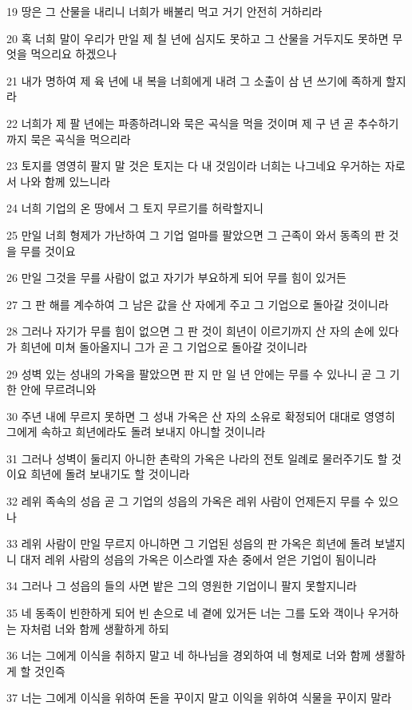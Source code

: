 \par 19 땅은 그 산물을 내리니 너희가 배불리 먹고 거기 안전히 거하리라
\par 20 혹 너희 말이 우리가 만일 제 칠 년에 심지도 못하고 그 산물을 거두지도 못하면 무엇을 먹으리요 하겠으나
\par 21 내가 명하여 제 육 년에 내 복을 너희에게 내려 그 소출이 삼 년 쓰기에 족하게 할지라
\par 22 너희가 제 팔 년에는 파종하려니와 묵은 곡식을 먹을 것이며 제 구 년 곧 추수하기까지 묵은 곡식을 먹으리라
\par 23 토지를 영영히 팔지 말 것은 토지는 다 내 것임이라 너희는 나그네요 우거하는 자로서 나와 함께 있느니라
\par 24 너희 기업의 온 땅에서 그 토지 무르기를 허락할지니
\par 25 만일 너희 형제가 가난하여 그 기업 얼마를 팔았으면 그 근족이 와서 동족의 판 것을 무를 것이요
\par 26 만일 그것을 무를 사람이 없고 자기가 부요하게 되어 무를 힘이 있거든
\par 27 그 판 해를 계수하여 그 남은 값을 산 자에게 주고 그 기업으로 돌아갈 것이니라
\par 28 그러나 자기가 무를 힘이 없으면 그 판 것이 희년이 이르기까지 산 자의 손에 있다가 희년에 미쳐 돌아올지니 그가 곧 그 기업으로 돌아갈 것이니라
\par 29 성벽 있는 성내의 가옥을 팔았으면 판 지 만 일 년 안에는 무를 수 있나니 곧 그 기한 안에 무르려니와
\par 30 주년 내에 무르지 못하면 그 성내 가옥은 산 자의 소유로 확정되어 대대로 영영히 그에게 속하고 희년에라도 돌려 보내지 아니할 것이니라
\par 31 그러나 성벽이 둘리지 아니한 촌락의 가옥은 나라의 전토 일례로 물러주기도 할 것이요 희년에 돌려 보내기도 할 것이니라
\par 32 레위 족속의 성읍 곧 그 기업의 성읍의 가옥은 레위 사람이 언제든지 무를 수 있으나
\par 33 레위 사람이 만일 무르지 아니하면 그 기업된 성읍의 판 가옥은 희년에 돌려 보낼지니 대저 레위 사람의 성읍의 가옥은 이스라엘 자손 중에서 얻은 기업이 됨이니라
\par 34 그러나 그 성읍의 들의 사면 밭은 그의 영원한 기업이니 팔지 못할지니라
\par 35 네 동족이 빈한하게 되어 빈 손으로 네 곁에 있거든 너는 그를 도와 객이나 우거하는 자처럼 너와 함께 생활하게 하되
\par 36 너는 그에게 이식을 취하지 말고 네 하나님을 경외하여 네 형제로 너와 함께 생활하게 할 것인즉
\par 37 너는 그에게 이식을 위하여 돈을 꾸이지 말고 이익을 위하여 식물을 꾸이지 말라
